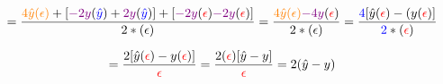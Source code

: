 \documentclass{article}
\begin{document}
\begin{displaymath}
=\frac{\textcolor{orange}{4\hat{y}(\epsilon{})}+[\textcolor{violet}{-2y}
(\textcolor{blue}{\hat{y}})+\textcolor{violet}{2y}
(\textcolor{blue}{\hat{y}})]+[\textcolor{violet}{-2y}
(\textcolor{red}{\epsilon{}})\textcolor{violet}{-2y}
(\textcolor{red}{\epsilon{}})]}{2*(\epsilon{})}
=\frac{\textcolor{orange}{4\hat{y}(\epsilon{})}\textcolor{violet}{-4y}
(\textcolor{red}{\epsilon{}})}{2*(\epsilon{})}
=\frac{\textcolor{blue}{4}[\hat{y}(\textcolor{red}{\epsilon{}})-
(y(\textcolor{red}{\epsilon{}})]}
{\textcolor{blue}{2}*(\textcolor{red}{\epsilon{}})}
\end{displaymath}

\begin{displaymath}
=\frac{2[\hat{y}(\textcolor{red}{\epsilon{}})-y(\textcolor{red}{\epsilon{}})]}
{\textcolor{red}{\epsilon{}}}
=\frac{2(\textcolor{red}{\epsilon{}})[\hat{y}-y]}
{\textcolor{red}{\epsilon{}}}
=2(\hat{y}-y)
\end{displaymath}
\end{document}
